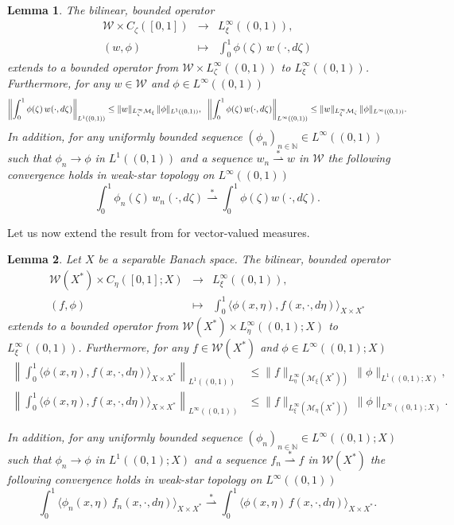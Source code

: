 \documentclass[10pt]{article}
\newtheorem{lemma}{Lemma}
\newcommand{\hd}{\hspace{0.2cm}}
\newcommand{\W}{\mathcal{W}}
\begin{document}
\begin{lemma}\cite[Lemma 4.7]{JPS2025}\label{impoest}
The bilinear,  bounded operator
\[
\begin{array}{ccl}
\W \times C_\zeta([0,1]) & \longrightarrow & L^\infty_\xi((0,1)),\\
(w,\phi) & \longmapsto & \int_0^1\phi(\zeta)\,w(\cdot,d\zeta)
\end{array}
\]
 extends to a bounded operator from $\W \times L^\infty_\zeta((0,1))$ to $L^\infty_\xi((0,1))$. 
Furthermore, for any $w\in \W$ and $\phi\in L^\infty((0,1))$
\[
\left\|\int_0^1 \phi(\zeta)\,w(\cdot,d\zeta)\right\|_{L^1((0,1))}\leq \|w\|_{L^\infty_\zeta \mathcal{M}_\xi}\,\|\phi\|_{L^1((0,1))}, \hd 
\left\|\int_0^1 \phi(\zeta)\,w(\cdot,d\zeta)\right\|_{L^\infty((0,1))}\leq \|w\|_{L^\infty_\xi \mathcal{M}_\zeta}\,\|\phi\|_{L^\infty((0,1))}.
\]
In addition, for any uniformly bounded sequence $(\phi_n)_{n\in \mathbb{N}} \in L^{\infty}((0,1))$ such that $\phi_n\rightarrow \phi$ in $L^1((0,1))$ and a sequence   $w_n\overset{*}{\rightharpoonup} w$  in $\W$ the following convergence holds in weak-star topology on $L^{\infty}((0,1))$
  \[
\int_0^1\phi_n(\zeta)\,w_n(\cdot,d\zeta)\overset{*}{\rightharpoonup} \int_0^1 \phi(\zeta)w(\cdot,d\zeta).
\]
\end{lemma}

Let us now extend the result from \cite[Lemma 4.7]{JPS2025} for vector-valued measures.



\begin{lemma}\label{impoestv}
Let $X$ be a separable Banach space. The bilinear,  bounded operator
\[
\begin{array}{ccl}
\W(X^*) \times C_\eta([0,1];X) & \longrightarrow & L^\infty_\xi((0,1)),\\
(f,\phi) & \longmapsto & \int_0^1\langle\phi(x,\eta),f(x,\cdot,d\eta)\rangle_{X\times X^*}
\end{array}
\]
 extends to a bounded operator from $\W(X^*) \times L^{\infty}_\eta((0,1);X)$ to $L^\infty_\xi((0,1))$.
Furthermore, for any $f\in \W(X^*)$ and $\phi\in L^\infty((0,1);X)$
\begin{align}\label{vecexta}
    \left\|\int_0^1\langle\phi(x,\eta),f(x,\cdot,d\eta)\rangle_{X\times X^*}\right\|_{L^1((0,1))}&\leq \|f\|_{L^\infty_\eta (\mathcal{M}_\xi(X^*))}\,\|\phi\|_{L^1((0,1);X)},\\ \nonumber
    \left\|\int_0^1\langle\phi(x,\eta),f(x,\cdot,d\eta)\rangle_{X\times X^*}\right\|_{L^\infty((0,1))}&\leq \|f\|_{L^\infty_\xi (\mathcal{M}_\eta(X^*))}\,\|\phi\|_{L^\infty((0,1);X)}.
\end{align}

In addition, for any uniformly bounded sequence $(\phi_n)_{n\in \mathbb{N}} \in L^{\infty}((0,1);X)$ such that $\phi_n\rightarrow \phi$ in $L^1((0,1);X)$ and a sequence   $f_n\overset{*}{\rightharpoonup} f$  in $\W(X^*)$ the following convergence holds in weak-star topology on $L^{\infty}((0,1))$
  \[
\int_0^1\langle\phi_n(x,\eta)\,f_n(x,\cdot,d\eta)\rangle_{X\times X^*}\overset{*}{\rightharpoonup} \int_0^1\langle\phi(x,\eta)\,f(x,\cdot,d\eta)\rangle_{X\times X^*}.
\]
\end{lemma}  
\end{document}
